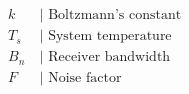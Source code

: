 \documentclass[preview]{standalone}
\begin{document}
\begin{align*}
&k\  &\text{| Boltzmann's constant} \\ &T_s\  &\text{| System temperature} \\ &B_n\  &\text{| Receiver bandwidth} \\ &F\  &\text{| Noise factor}
\end{align*}
\end{document}
